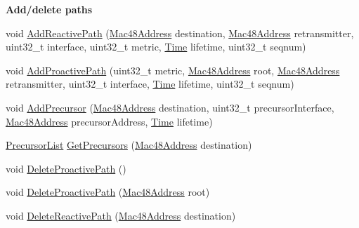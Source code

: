 \begin{Indent}{\bf Add/delete paths}\par
\begin{DoxyCompactItemize}
\item 
void \hyperlink{classns3_1_1dot11s_1_1HwmpRtable_af764d62637a7c567706f4fa0cc09c51d}{Add\+Reactive\+Path} (\hyperlink{classns3_1_1Mac48Address}{Mac48\+Address} destination, \hyperlink{classns3_1_1Mac48Address}{Mac48\+Address} retransmitter, uint32\+\_\+t interface, uint32\+\_\+t metric, \hyperlink{classns3_1_1Time}{Time} lifetime, uint32\+\_\+t seqnum)
\item 
void \hyperlink{classns3_1_1dot11s_1_1HwmpRtable_adf74c1ad8e3bb8c8bcd9fda27018f542}{Add\+Proactive\+Path} (uint32\+\_\+t metric, \hyperlink{classns3_1_1Mac48Address}{Mac48\+Address} root, \hyperlink{classns3_1_1Mac48Address}{Mac48\+Address} retransmitter, uint32\+\_\+t interface, \hyperlink{classns3_1_1Time}{Time} lifetime, uint32\+\_\+t seqnum)
\item 
void \hyperlink{classns3_1_1dot11s_1_1HwmpRtable_ad867ab6ba437c2151907025750bf818b}{Add\+Precursor} (\hyperlink{classns3_1_1Mac48Address}{Mac48\+Address} destination, uint32\+\_\+t precursor\+Interface, \hyperlink{classns3_1_1Mac48Address}{Mac48\+Address} precursor\+Address, \hyperlink{classns3_1_1Time}{Time} lifetime)
\item 
\hyperlink{classns3_1_1dot11s_1_1HwmpRtable_a91366ab9155f7ff630c797a8d40262fc}{Precursor\+List} \hyperlink{classns3_1_1dot11s_1_1HwmpRtable_a88e406b2cecdc86d1b87054454920e23}{Get\+Precursors} (\hyperlink{classns3_1_1Mac48Address}{Mac48\+Address} destination)
\item 
void \hyperlink{classns3_1_1dot11s_1_1HwmpRtable_a8a43d05a01309adc7bc4b0a438aaa76b}{Delete\+Proactive\+Path} ()
\item 
void \hyperlink{classns3_1_1dot11s_1_1HwmpRtable_a9dd62488e218cfb2829c00df120ce7c0}{Delete\+Proactive\+Path} (\hyperlink{classns3_1_1Mac48Address}{Mac48\+Address} root)
\item 
void \hyperlink{classns3_1_1dot11s_1_1HwmpRtable_a1d23ed62cf717efb132d9647d0fd1734}{Delete\+Reactive\+Path} (\hyperlink{classns3_1_1Mac48Address}{Mac48\+Address} destination)
\end{DoxyCompactItemize}
\end{Indent}
